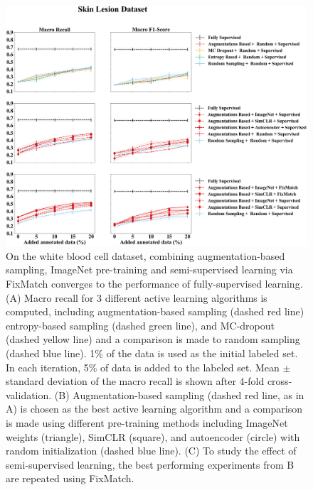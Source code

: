 \begin{figure}[htbp]
\centering
\captionsetup{format=plain}
\includegraphics[width=\textwidth]{figures/fig_2_skin_recall_f1.png}
\caption{On the white blood cell dataset, combining augmentation-based sampling, ImageNet pre-training and semi-supervised learning via FixMatch converges to the performance of fully-supervised learning. (A) Macro recall for 3 different active learning algorithms is computed, including augmentation-based sampling (dashed red line) entropy-based sampling (dashed green line), and MC-dropout (dashed yellow line) and a comparison is made to random sampling (dashed blue line). 1\% of the data is used as the initial labeled set. In each iteration, 5\% of data is added to the labeled set. Mean $\pm$ standard deviation of the macro recall is shown after 4-fold cross-validation. (B) Augmentation-based sampling (dashed red line, as in A) is chosen as the best active learning algorithm and a comparison is made using different pre-training methods including ImageNet weights (triangle), SimCLR (square), and autoencoder (circle) with random initialization (dashed blue line). (C) To study the effect of semi-supervised learning, the best performing experiments from B are repeated using FixMatch.}
\label{fig:fig_2_skin_recall_f1}
\end{figure}

